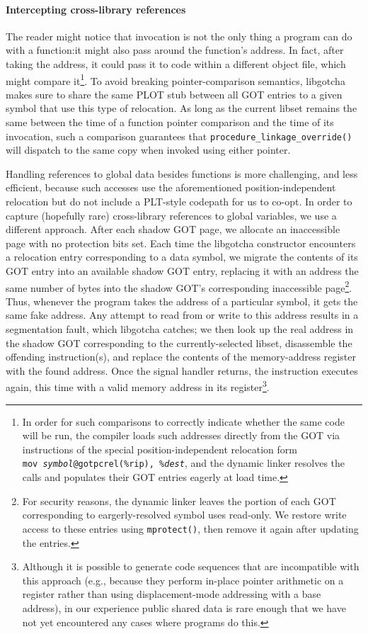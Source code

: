 \paragraph{Intercepting cross-library references}

The reader might notice that invocation is not the only thing a program can do with a
function:\@ it might also pass around the function's address.  In fact, after taking
the address, it could pass it to code within a different object file, which might
compare it\footnote{In order for such comparisons to correctly indicate whether the
same code will be run, the compiler loads such addresses directly from the GOT via
instructions of the special position-independent relocation form
\texttt{mov~\textit{symbol}@gotpcrel(\%rip),~\%\textit{dest}}, and the dynamic linker
resolves the calls and populates their GOT entries eagerly at load time.}.  To avoid
breaking pointer-comparison semantics, libgotcha makes sure to share the same PLOT
stub between all GOT entries to a given symbol that use this type of
relocation.  As long as the current libset remains the same between the time of a
function pointer comparison and the time of its invocation, such a comparison
guarantees that \texttt{procedure\_linkage\_override()} will dispatch to the same
copy when invoked using either pointer.

Handling references to global data besides functions is more challenging, and less
efficient, because such accesses use the aforementioned position-independent
relocation but do not include a PLT-style codepath for us to co-opt.
In order to capture (hopefully rare) cross-library references to global variables,
we use a different approach.  After each shadow GOT page, we allocate an inaccessible
page with no protection bits set.  Each time the libgotcha constructor encounters a
relocation entry corresponding to a data symbol, we migrate the contents of its GOT
entry into an available shadow GOT entry, replacing it with an address the same
number of bytes into the shadow GOT's corresponding inaccessible page\footnote{For
security reasons, the dynamic linker leaves the portion of each GOT corresponding to
eargerly-resolved symbol uses read-only.  We restore write access to these entries
using \texttt{mprotect()}, then remove it again after updating the entries.}.  Thus,
whenever the program takes the address of a particular symbol, it gets the same fake
address.  Any attempt to read from or write to this address results in a segmentation
fault, which libgotcha catches; we then look up the real address in the shadow GOT
corresponding to the currently-selected libset, disassemble the offending
instruction(s), and replace the contents of the memory-address register with the
found address.  Once the signal handler returns, the instruction executes again, this
time with a valid memory address in its register\footnote{Although it is possible to
generate code sequences that are incompatible with this approach (e.g., because they
perform in-place pointer arithmetic on a register rather than using displacement-mode
addressing with a base address), in our experience public shared data is rare enough
that we have not yet encountered any cases where programs do this.}.

